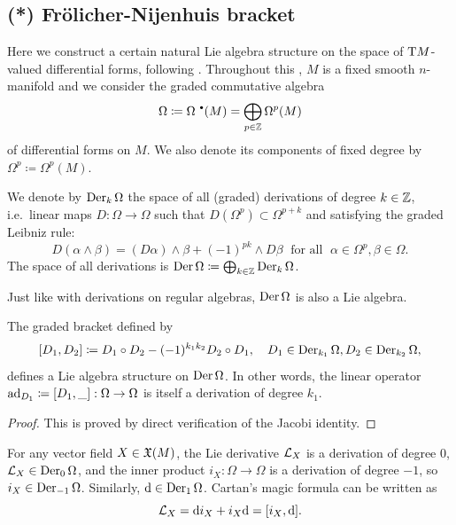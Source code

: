 \subsection{(*) Fr\"olicher-Nijenhuis bracket}\label{sec: Frolicher}


Here we construct a certain natural Lie algebra structure on the space of $\mathrm{T} M$-valued differential forms, following \cite{Kolar}. Throughout this \subsect, $M$ is a fixed smooth $n$-manifold and we consider the graded commutative algebra 
\[\Omega\coloneqq \Omega^{\smbullet}(M)=\bigoplus_{p\in\bbZ} \Omega^p(M)\] of differential forms on $M$. We also denote its components of fixed degree by $\Omega^p\coloneqq \Omega^p(M)$. 

\begin{defn}
    We denote by $\operatorname{Der}_k\Omega$ the space of all (graded) derivations of degree $k\in\mathbb{Z}$, i.e.\ linear maps $D:\Omega\to \Omega$ such that $D(\Omega^p)\subset \Omega^{p+k}$ and satisfying the graded Leibniz rule:
    \[D(\alpha\wedge\beta)=(D\alpha)\wedge\beta+(-1)^{pk}\wedge D\beta \;\text{ for all }\;\alpha\in\Omega^p,\beta\in\Omega.\]
    The space of all derivations is $\operatorname{Der}\Omega\coloneqq \bigoplus_{k\in\mathbb{Z}} \operatorname{Der}_k\Omega$.
\end{defn}

Just like with derivations on regular algebras, $\operatorname{Der}\Omega$ is also a Lie algebra.

\begin{lem}
    The graded bracket defined by
    \[[D_1,D_2]\coloneqq D_1\circ D_2-(-1)^{k_1k_2}D_2\circ D_1,\quad D_1\in\operatorname{Der}_{k_1}\Omega,D_2\in\operatorname{Der}_{k_2}\Omega,\]
    defines a Lie algebra structure on $\operatorname{Der}\Omega$. In other words, the linear operator $\mathrm{ad}_{D_1}\coloneqq [D_1,\_]:\Omega\to \Omega$ is itself a derivation of degree $k_1$.
\end{lem}
\begin{proof}
    This is proved by direct verification of the Jacobi identity.
\end{proof}

\begin{example}
    For any vector field $X\in\mathfrak{X}(M)$, the Lie derivative $\mathcal{L}_X$ is a derivation of degree $0$, $\mathcal{L}_X\in\operatorname{Der}_0\Omega$, and the inner product $i_X:\Omega\to \Omega$ is a derivation of degree $-1$, so $i_X\in\operatorname{Der}_{-1}\Omega$. Similarly, ${\mathrm{d}}\in\operatorname{Der}_1\Omega$. Cartan's magic formula can be written as 
    \[\mathcal{L}_X={\mathrm{d}} i_X+i_X {\mathrm{d}}=[i_X,{\mathrm{d}}].\]
\end{example}

